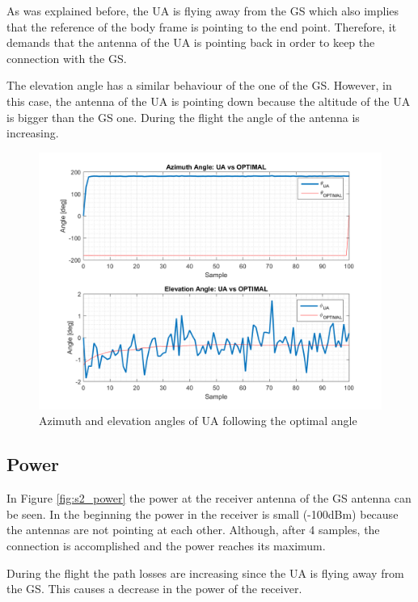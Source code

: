 As was explained before, the UA is flying away from the GS which also implies that the reference of the body frame is pointing to the end point. Therefore, it demands that the antenna of the UA is pointing back in order to keep the connection with the GS. 

The elevation angle has a similar behaviour of the one of the GS. However, in this case, the antenna of the UA is pointing down because the altitude of the UA is bigger than the GS one. During the flight the angle of the antenna is increasing.


\begin{figure}[H]
	\centering
	\includegraphics[scale=0.75]{figures/s2_ua.png}
	\caption{Azimuth and elevation angles of UA following the optimal angle}
	\label{fig:s2_ua}
\end{figure}


\subsection{Power}
In Figure \ref{fig:s2_power} the power at the receiver antenna of the GS antenna can be seen. In the beginning the power in the receiver is small (-100dBm) because the antennas are not pointing at each other. Although, after 4 samples, the connection is accomplished and the power reaches its maximum. 

During the flight the path losses are increasing since the UA is flying away from the GS. This causes a decrease in the power of the receiver.

